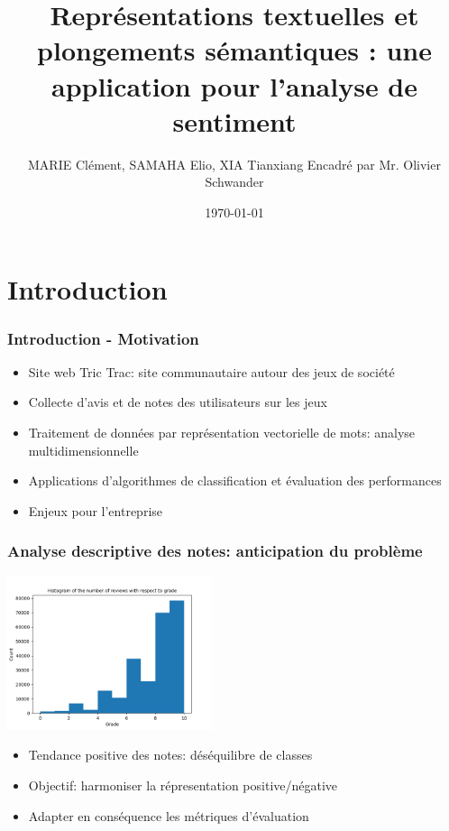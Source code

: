 \documentclass{beamer}
\title{Représentations textuelles et plongements sémantiques : une application pour l'analyse de sentiment}
\author{MARIE Clément, SAMAHA Elio, XIA Tianxiang 
Encadré par Mr. Olivier Schwander}
\date{\today}
\begin{document}
\frame{\titlepage}

\begin{frame}
    \tableofcontents
\end{frame}
\section{Introduction}
\begin{frame}
\frametitle{Introduction - Motivation}


\vspace{1cm}

\begin{itemize}
  \item Site web Tric Trac: site communautaire autour des jeux de société
  \item Collecte d'avis et de notes des utilisateurs sur les jeux
  \item Traitement de données par représentation vectorielle de mots: analyse multidimensionnelle 
  \item Applications d'algorithmes de classification et évaluation des performances
  \item Enjeux pour l'entreprise   
\end{itemize}
\end{frame}

\begin{frame}
\frametitle{Analyse descriptive des notes: anticipation du problème}

\centering
\includegraphics[width=6cm]{hist_plot_count.png}

\begin{itemize}
  \item Tendance positive des notes: déséquilibre de classes
  \item Objectif: harmoniser la répresentation positive/négative
  \item Adapter en conséquence les métriques d'évaluation 
\end{itemize}
\end{frame}
\end{document}
